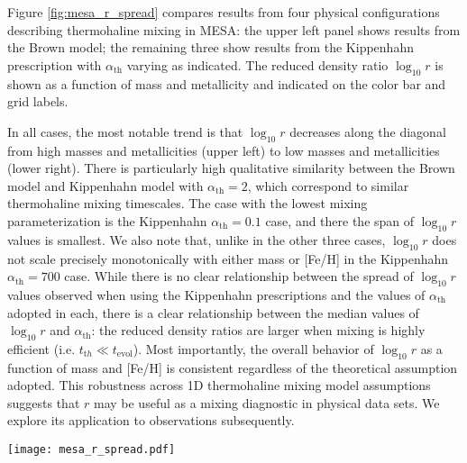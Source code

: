 %
%
Figure \ref{fig:mesa_r_spread} compares results from four physical configurations describing thermohaline mixing in MESA: the upper left panel shows results from the Brown model; the remaining three show results from the Kippenhahn prescription with $\alpha_{\text{th}}$ varying as indicated. The reduced density ratio $\log_{10} r$ is shown as a function of mass and metallicity and indicated on the color bar and grid labels.
%

In all cases, the most notable trend is that $\log_{10} r$ decreases along the diagonal from high masses and metallicities (upper left) to low masses and metallicities (lower right). There is particularly high qualitative similarity between the Brown model and Kippenhahn model with $\alpha_{\text{th}} = 2$, which correspond to similar thermohaline mixing timescales. The case with the lowest mixing parameterization is the Kippenhahn $\alpha_{\text{th}} = 0.1$ case, and there the span of $\log_{10} r$ values is smallest. We also note that, unlike in the other three cases, $\log_{10} r$ does not scale precisely monotonically with either mass or [Fe/H] in the Kippenhahn $\alpha_{\text{th}} = 700$ case. While there is no clear relationship between the spread of $\log_{10} r$ values observed when using the Kippenhahn prescriptions and the values of $\alpha_{\text{th}}$ adopted in each, there is a clear relationship between the median values of $\log_{10} r$ and $\alpha_{\text{th}}$: the reduced density ratios are larger when mixing is highly efficient (i.e. $t_{\mathrm th}\ll t_{\text{evol}}$). 
Most importantly, the overall behavior of $\log_{10} r$ as a function of mass and [Fe/H] is consistent regardless of the theoretical assumption adopted.
This robustness across 1D thermohaline mixing model assumptions suggests that $r$ may be useful as a mixing diagnostic in physical data sets. We explore its application to observations subsequently.

\begin{figure*}
    \centering
    \texttt{[image: mesa\_r\_spread.pdf]}
    \caption{The reduced density ratio $\log_{10} r$ is extracted as discussed in Section \ref{sec:mesa_experiment} for four grids of stellar models with differing prescriptions for thermohaline mixing. 
    Results for $\log_{10} r$ are shown as a function of stellar mass and metallicity [Fe/H], with high values of $\log_{10} r$ in brighter colors (yellow) and low values of $\log_{10} r$ in darker colors (purple). 
    The model name and mixing efficiency, $\alpha_{\text{th}}$ (where applicable) constitute the physical configuration and are indicated in the panel labels.}
    \label{fig:mesa_r_spread}
\end{figure*}